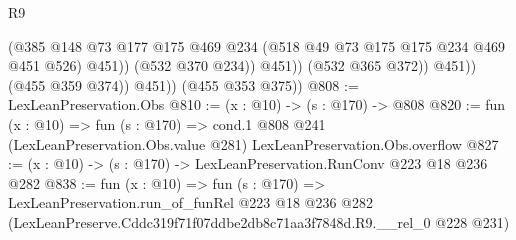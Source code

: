 \begin{lexlean}{R9}
\begin{coremodule}
                          (@385
                            @148
                            @73
                            @177
                            @175
                            @469
                            @234
                            (@518 @49 @73 @175 @175 @234 @469 @451 @526)
                            @451))
                        (@532 @370 @234))
                      @451))
                  (@532 @365 @372))
                @451))
            (@455 @359 @374))
          @451))
      (@455 @353 @375))
@808 := LexLeanPreservation.Obs
@810 := (x : @10) -> (s : @170) -> @808
@820 := fun (x : @10) =>
  fun (s : @170) =>
  cond.{1} @808 @241 (LexLeanPreservation.Obs.value @281) LexLeanPreservation.Obs.overflow
@827 := (x : @10) -> (s : @170) -> LexLeanPreservation.RunConv @223 @18 @236 @282
@838 := fun (x : @10) =>
  fun (s : @170) =>
  LexLeanPreservation.run_of_funRel
    @223
    @18
    @236
    @282
    (LexLeanPreserve.Cddc319f71f07ddbe2db8c71aa3f7848d.R9.__rel_0 @228 @231)
\end{coremodule}
\end{lexlean}
